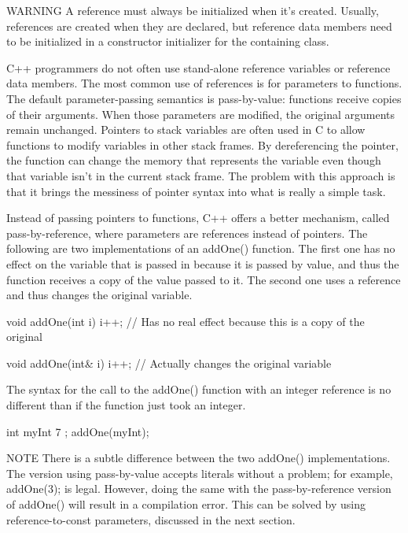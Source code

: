 \begin{myWarning}{WARNING}
A reference must always be initialized when it’s created. Usually, references are created when they are declared, but reference data members need to be initialized in a constructor initializer for the containing class.
\end{myWarning}


C++ programmers do not often use stand-alone reference variables or reference data members. The most common use of references is for parameters to functions. The default parameter-passing semantics is pass-by-value: functions receive copies of their arguments. When those parameters are modified, the original arguments remain unchanged. Pointers to stack variables are often used in C to allow functions to modify variables in other stack frames. By dereferencing the pointer, the function can change the memory that represents the variable even though that variable isn’t in the current stack frame. The problem with this approach is that it brings the messiness of pointer syntax into what is really a simple task.

Instead of passing pointers to functions, C++ offers a better mechanism, called pass-by-reference, where parameters are references instead of pointers. The following are two implementations of an addOne() function. The first one has no effect on the variable that is passed in because it is passed by value, and thus the function receives a copy of the value passed to it. The second one uses a reference and thus changes the original variable.

\begin{cpp}
void addOne(int i)
{
    i++; // Has no real effect because this is a copy of the original
}

void addOne(int& i)
{
    i++; // Actually changes the original variable
}
\end{cpp}

The syntax for the call to the addOne() function with an integer reference is no different than if the function just took an integer.

\begin{cpp}
int myInt { 7 };
addOne(myInt);
\end{cpp}

\begin{myNotic}{NOTE}
There is a subtle difference between the two addOne() implementations. The version using pass-by-value accepts literals without a problem; for example, addOne(3); is legal. However, doing the same with the pass-by-reference version of addOne() will result in a compilation error. This can be solved by using reference-to-const parameters, discussed in the next section.
\end{myNotic}

